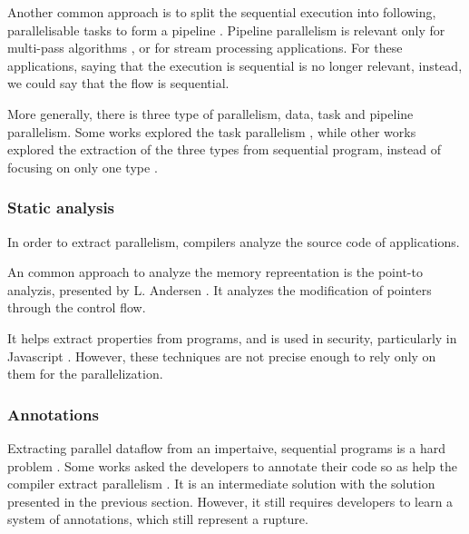 Another common approach is to split the sequential execution into following, parallelisable tasks to form a pipeline \cite{Kamruzzaman2013,Fernandez2014a}.
Pipeline parallelism is relevant only for multi-pass algorithms \cite{Conway1963}, or for stream processing applications.
For these applications, saying that the execution is sequential is no longer relevant, instead, we could say that the flow is sequential.

More generally, there is three type of parallelism, data, task and pipeline parallelism.
Some works explored the task parallelism \cite{Rinard1996}, while other works explored the extraction of the three types from sequential program, instead of focusing on only one type \cite{Li2012}.


\subsubsection{Static analysis}

In order to extract parallelism, compilers analyze the source code of applications.

An common approach to analyze the memory repreentation is the point-to analyzis, presented by L. Andersen \cite{Andersen1994}.
It analyzes the modification of pointers through the control flow.

It helps extract properties from programs, and is used in security, particularly in Javascript \cite{Chudnov2015}.
However, these techniques are not precise enough to rely only on them for the parallelization.

\subsubsection{Annotations}

Extracting parallel dataflow from an impertaive, sequential programs is a hard problem \cite{Johnston2004a}.
Some works asked the developers to annotate their code so as help the compiler extract parallelism \cite{Vandierendonck2010a}.
It is an intermediate solution with the solution presented in the previous section.
However, it still requires developers to learn a system of annotations, which still represent a rupture.

\endinput


Continuations and coroutines \cite{Haynes1984}
-> THIS

Parallel closures, a new twist on an old idea \cite{Matsakis2012a}

Continuation of work on SEDA \cite{Salmito2014}



